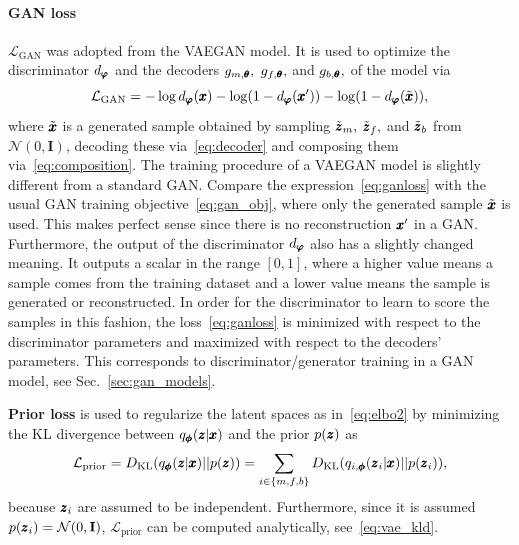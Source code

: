 \paragraph{GAN loss} $\mathcal{L}_{\text{GAN}}$ was adopted from the VAEGAN model. It is used to optimize the discriminator $d_{\pmb{{\varphi}}}$ and the decoders $g_{m,\pmb{{\theta}}},$ $g_{f,\pmb{{\theta}}},$ and $g_{b,\pmb{{\theta}}},$ of the model via
\begin{equation} \label{eq:ganloss}
    \mathcal{L}_{\text{GAN}}  = - \log d_{\pmb{{\varphi}}}(\pmb{{x}}) - \log (1 - d_{\pmb{{\varphi}}}(\pmb{{x}}')) - \log (1-d_{\pmb{{\varphi}}}(\tilde{\pmb{{x}}})),
\end{equation}
where $\tilde{\pmb{{x}}}$ is a generated sample obtained by sampling $\tilde{\pmb{{z}}}_m,$ $\tilde{\pmb{{z}}}_f,$ and $\tilde{\pmb{{z}}}_b$ from $\mathcal{N}(0,\textbf{I})$, decoding these via~\eqref{eq:decoder} and composing them via~\eqref{eq:composition}. The training procedure of a VAEGAN model is slightly different from a standard GAN. Compare the expression~\eqref{eq:ganloss} with the usual GAN training objective~\eqref{eq:gan_obj}, where only the generated sample $\tilde{\pmb{{x}}}$ is used. This makes perfect sense since there is no reconstruction  $\pmb{{x}}'$ in a GAN. Furthermore, the output of the discriminator $d_{\pmb{{\varphi}}}$ also has a slightly changed meaning. It outputs a scalar in the range $[0,1]$, where a higher value means a sample comes from the training dataset and a lower value means the sample is generated or reconstructed. In order for the discriminator to learn to score the samples in this fashion, the loss~\eqref{eq:ganloss} is minimized with respect to the discriminator parameters and maximized with respect to the decoders' parameters. This corresponds to discriminator/generator training in a GAN model, see Sec.~\ref{sec:gan_models}.

\textbf{Prior loss} is used to regularize the latent spaces as in~\eqref{eq:elbo2} by minimizing the KL divergence between $q_{\pmb{{\phi}}} (\pmb{{z}} \vert \pmb{{x}})$ and the prior $p(\pmb{{z}})$ as
\begin{equation} \label{eq:kldloss}
    \mathcal{L}_{\text{prior}} = D_\text{KL} (q_{\pmb{{\phi}}} (\pmb{{z}} \vert \pmb{{x}}) \vert \vert p(\pmb{{z}})) = \sum_{i \in \lbrace m, f, b \rbrace} D_\text{KL} (q_{i,\pmb{{\phi}}} (\pmb{{z}}_i  \vert \pmb{{x}}) \vert\vert p(\pmb{{z}}_i)),
\end{equation} 
because $\pmb{{z}}_i$ are assumed to be independent. Furthermore, since it is assumed $p(\pmb{{z}}_i) = \mathcal{N}(0,\mathbf{I})$, $\mathcal{L}_{\text{prior}}$ can be computed analytically, see~\eqref{eq:vae_kld}.

